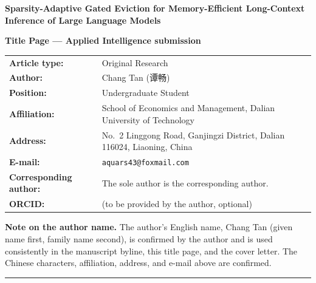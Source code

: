 \documentclass[11pt,a4paper]{article}
\begin{document}
\begin{center}
  {\LARGE\bfseries Sparsity-Adaptive Gated Eviction for Memory-Efficient
   Long-Context Inference of Large Language Models\par}
\end{center}

\vspace{1.6em}

\noindent\textbf{Title Page --- Applied Intelligence submission}

\vspace{1.2em}

\noindent\begin{tabular}{@{}ll@{}}
\textbf{Article type:}      & Original Research \\
\textbf{Author:}            & Chang Tan ({\cjkfont 谭畅}) \\
\textbf{Position:}          & Undergraduate Student \\
\textbf{Affiliation:}       & School of Economics and Management,
                              Dalian University of Technology \\
\textbf{Address:}           & No.~2 Linggong Road, Ganjingzi District,
                              Dalian 116024, Liaoning, China \\
\textbf{E-mail:}            & \texttt{aquars43@foxmail.com} \\
\textbf{Corresponding author:} & The sole author is the corresponding author. \\
\textbf{ORCID:}             & (to be provided by the author, optional) \\
\end{tabular}

\vspace{1.2em}

\noindent\textbf{Note on the author name.} The author's English name,
Chang Tan (given name first, family name second), is confirmed by the
author and is used consistently in the manuscript byline, this title
page, and the cover letter. The Chinese characters, affiliation,
address, and e-mail above are confirmed.

\vspace{1.6em}

\noindent\rule{\textwidth}{0.4pt}

\vspace{1.2em}


\vspace{0.8em}
\end{document}

